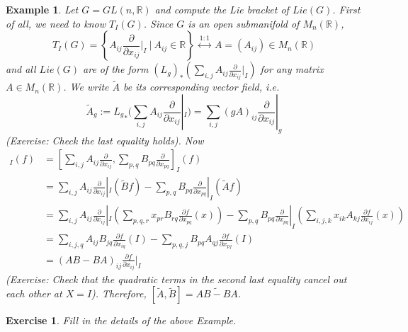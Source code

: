 \documentclass[11pt]{article}
\newtheorem{example}[theorem]{Example}
\newtheorem{exercise}[theorem]{Exercise}
\newcommand{\bb}[1]{\mathbb{#1}}
\begin{document}
\begin{example} \label{vfgl}
Let $G = GL(n,\bb{R})$ and compute the Lie bracket of $Lie(G)$. First of all, we need to know $T_I(G)$. Since $G$ is an open submanifold of $M_n(\bb{R})$,
$$T_I(G) = \left\{ A_{ij}\frac{\partial}{\partial x_{ij}}|_I\ \Big|\ A_{ij} \in \bb{R} \right\}\ \stackrel{1:1}{\longleftrightarrow}\ A = (A_{ij}) \in M_n(\bb{R})$$
and all $Lie(G)$ are of the form $(L_g)_*(\sum_{i,j} A_{ij}\frac{\partial}{\partial x_{ij}}|_I)$ for any matrix $A \in M_n(\bb{R})$. We write $\tilde{A}$ be its corresponding vector field, i.e.
$$\tilde{A}_g := {L_g}_*(\sum_{i,j} A_{ij}\frac{\partial}{\partial x_{ij}}|_I) = \sum_{i,j}(gA)_{ij}\frac{\partial}{\partial x_{ij}}|_g$$
(Exercise: Check the last equality holds). Now
\begin{align*}
[\tilde{A},\tilde{B}]_I(f) &= [\sum_{i,j}A_{ij}\frac{\partial}{\partial x_{ij}}, \sum_{p,q}B_{pq}\frac{\partial}{\partial x_{pq}}]_I(f)\\
 &= \sum_{i,j}A_{ij}\frac{\partial}{\partial x_{ij}}|_I (\tilde{B}f) -  \sum_{p,q}B_{pq}\frac{\partial}{\partial x_{pq}}|_I (\tilde{A}f)\\
 &= \sum_{i,j}A_{ij}\frac{\partial}{\partial x_{ij}}|_I (\sum_{p,q,r}x_{pr}B_{rq}\frac{\partial f}{\partial x_{pq}}(x)) - \sum_{p,q}B_{pq}\frac{\partial}{\partial x_{pq}}|_I (\sum_{i,j,k}x_{ik}A_{kj}\frac{\partial f}{\partial x_{ij}}(x))\\
 &= \sum_{i,j,q}A_{ij}B_{jq}\frac{\partial f}{\partial x_{iq}}(I) - \sum_{p,q,j}B_{pq}A_{qj}\frac{\partial f}{\partial x_{pj}}(I)\\
 &= (AB-BA)_{ij}\frac{\partial f}{\partial x_{ij}}|_I
\end{align*}
(Exercise: Check that the quadratic terms in the second last equality cancel out each other at $X = I$). Therefore, $[\tilde{A}, \tilde{B}] = \widetilde{AB-BA}$.
\end{example}
\begin{exercise}
Fill in the details of the above Example.
\end{exercise}
\end{document}

